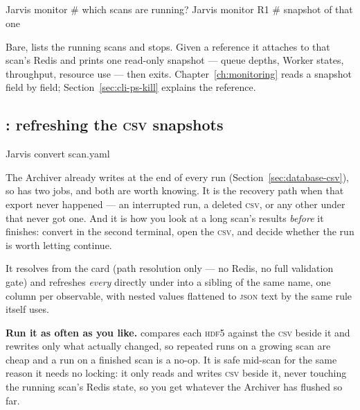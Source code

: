 \subsection{}

\begin{terminal}
\begin{jcmd}
Jarvis monitor       # which scans are running?
Jarvis monitor R1    # snapshot of that one
\end{jcmd}
\end{terminal}

Bare,  lists the running scans and stops. Given a reference it attaches to
that scan's Redis and prints one read-only snapshot --- queue depths, Worker states,
throughput, resource use --- then exits. Chapter~\ref{ch:monitoring} reads a snapshot
field by field; Section~\ref{sec:cli-ps-kill} explains the reference.

\subsection{: refreshing the \textsc{csv} snapshots}
\label{sec:cli-convert}

\begin{terminal}
\begin{jcmd}
Jarvis convert scan.yaml
\end{jcmd}
\end{terminal}

The Archiver already writes  at the end of every run
(Section~\ref{sec:database-csv}), so  has two jobs, and both are worth
knowing. It is the recovery path when that export never happened --- an interrupted run,
a deleted \textsc{csv}, or any other  under  that never got
one. And it is how you look at a long scan's results \emph{before} it finishes: convert
in the second terminal, open the \textsc{csv}, and decide whether the run is worth
letting continue.

It resolves  from the card (path resolution only --- no Redis,
no full validation gate) and refreshes \emph{every}  directly under
 into a sibling  of the same name, one column per observable,
with nested values flattened to \textsc{json} text by the same rule 
itself uses.

\textbf{Run it as often as you like.}  compares each \textsc{hdf5} against
the \textsc{csv} beside it and rewrites only what actually changed, so repeated runs on a
growing scan are cheap and a run on a finished scan is a no-op. It is safe mid-scan for
the same reason it needs no locking: it only reads  and writes
\textsc{csv} beside it, never touching the running scan's Redis state, so you get whatever
the Archiver has flushed so far.

